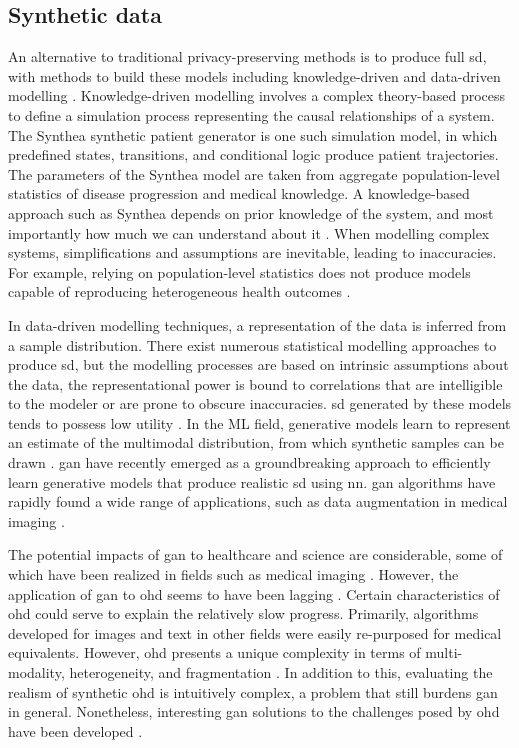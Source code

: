 \subsection{Synthetic data}
An alternative to traditional privacy-preserving methods is to produce full \gls{sd}, with methods to build these models including knowledge-driven and data-driven modelling \cite{Kim_2017}. Knowledge-driven modelling involves a complex theory-based process to define a simulation process representing the causal relationships of a system. The Synthea \cite{Walonoski_2017} synthetic patient generator is one such simulation model, in which predefined states, transitions, and conditional logic produce patient trajectories. The parameters of the Synthea model are taken from aggregate population-level statistics of disease progression and medical knowledge. A knowledge-based approach such as Synthea depends on prior knowledge of the system, and most importantly how much we can understand about it \cite{Kim_2017}. When modelling complex systems, simplifications and assumptions are inevitable, leading to inaccuracies. For example, relying on population-level statistics does not produce models capable of reproducing heterogeneous health outcomes \cite{Chen_2019}.\par
In data-driven modelling techniques, a representation of the data is inferred from a sample distribution. There exist numerous statistical modelling approaches to produce \gls{sd}, but the modelling processes are based on intrinsic assumptions about the data, the representational power is bound to correlations that are intelligible to the modeler or are prone to obscure inaccuracies. \gls{sd} generated by these models tends to possess low utility \cite{Rankin2020}. In the ML field, generative models learn to represent an estimate of the multimodal distribution, from which synthetic samples can be drawn \cite{goodfellow2016nips}. \Gls{gan} \cite{NIPS2014_5423} have recently emerged as a groundbreaking approach to efficiently learn generative models that produce realistic \gls{sd} using \gls{nn}. \gls{gan} algorithms have rapidly found a wide range of applications, such as data augmentation in medical imaging \cite{Kadurin_2017}.\par
The potential impacts of \gls{gan} to healthcare and science are considerable, some of which have been realized in fields such as medical imaging \cite{Yi_2019}. However, the application of \gls{gan} to \gls{ohd} seems to have been lagging \cite{Xiao_2018_chall}. Certain characteristics of \gls{ohd} could serve to explain the relatively slow progress. Primarily, algorithms developed for images and text in other fields were easily re-purposed for medical equivalents. However, \gls{ohd} presents a unique complexity in terms of multi-modality, heterogeneity, and fragmentation \cite{Xiao_2018_chall}. In addition to this, evaluating the realism of synthetic \gls{ohd} is intuitively complex, a problem that still burdens \gls{gan} in general. Nonetheless, interesting \gls{gan} solutions to the challenges posed by \gls{ohd} have been developed \cite{esteban2017real,Che_2017,Choi2017-nt,yahi2017generative}.